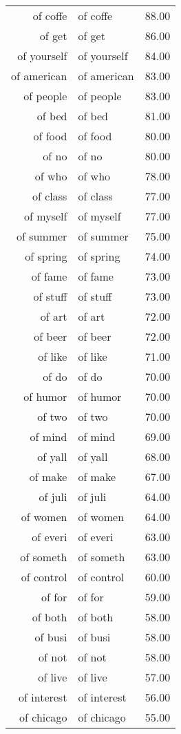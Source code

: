 \begin{table}[ht]
\begin{tabular}{rlr}
  of coffe & of coffe & 88.00 \\ 
  of get & of get & 86.00 \\ 
  of yourself & of yourself & 84.00 \\ 
  of american & of american & 83.00 \\ 
  of people & of people & 83.00 \\ 
  of bed & of bed & 81.00 \\ 
  of food & of food & 80.00 \\ 
  of no & of no & 80.00 \\ 
  of who & of who & 78.00 \\ 
  of class & of class & 77.00 \\ 
  of myself & of myself & 77.00 \\ 
  of summer & of summer & 75.00 \\ 
  of spring & of spring & 74.00 \\ 
  of fame & of fame & 73.00 \\ 
  of stuff & of stuff & 73.00 \\ 
  of art & of art & 72.00 \\ 
  of beer & of beer & 72.00 \\ 
  of like & of like & 71.00 \\ 
  of do & of do & 70.00 \\ 
  of humor & of humor & 70.00 \\ 
  of two & of two & 70.00 \\ 
  of mind & of mind & 69.00 \\ 
  of yall & of yall & 68.00 \\ 
  of make & of make & 67.00 \\ 
  of juli & of juli & 64.00 \\ 
  of women & of women & 64.00 \\ 
  of everi & of everi & 63.00 \\ 
  of someth & of someth & 63.00 \\ 
  of control & of control & 60.00 \\ 
  of for & of for & 59.00 \\ 
  of both & of both & 58.00 \\ 
  of busi & of busi & 58.00 \\ 
  of not & of not & 58.00 \\ 
  of live & of live & 57.00 \\ 
  of interest & of interest & 56.00 \\ 
  of chicago & of chicago & 55.00 \\ 

\end{tabular}
\end{table}
